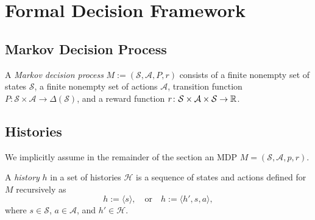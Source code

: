 
\section{Formal Decision Framework}

\subsection{Markov Decision Process}

\begin{definition} \label{def:MDP}
A \emph{Markov decision process} $M := (\mathcal{S}, \mathcal{A}, P, r)$ consists of a finite nonempty set of states $\mathcal{S}$, a finite nonempty set of actions $\mathcal{A}$, transition function $P\colon \mathcal{S} \times \mathcal{A} \to  \Delta(\mathcal{S})$, and a reward function $r \colon \mathcal{S} \times \mathcal{A} \times \mathcal{S} \to \mathbb{R}$.
 \leanok
\end{definition}

\subsection{Histories}

We implicitly assume in the remainder of the section an MDP $M = (\mathcal{S}, \mathcal{A}, p, r)$.
\begin{definition} \label{def:Hist}
A \emph{history} $h$ in a set of histories $\mathcal{H}$ is a sequence of states and actions defined for $M$ recursively as
\[
  h := \langle s \rangle, \quad
  \text{or} \quad
  h := \langle h', s, a \rangle,
\]
where $s \in \mathcal{S}$, $a\in \mathcal{A}$, and $h'\in \mathcal{H}$.
 \leanok
\end{definition}

